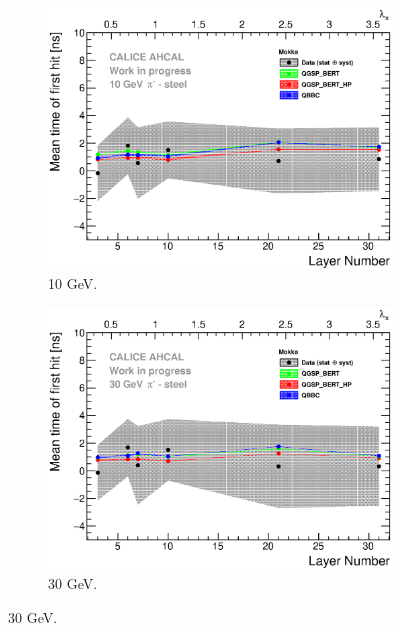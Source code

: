 \begin{figure}[htbp!]
  \begin{subfigure}[t]{0.49\textwidth}
    \centering
    \includegraphics[width=1\textwidth]{../Thesis_Plots/Timing/Pions/Plots/ComparisonToSim/Time_Depth_10GeV_Mokka.eps}
    \caption{10 GeV.}\label{fig:Depth_SimData_10GeV}
  \end{subfigure}
  \hfill
  \begin{subfigure}[t]{0.49\textwidth}
    \centering
    \includegraphics[width=1\textwidth]{../Thesis_Plots/Timing/Pions/Plots/ComparisonToSim/Time_Depth_30GeV_Mokka.eps}
    \caption{30 GeV.} \label{fig:Depth_SimData_30GeV}
  \end{subfigure}

\end{figure}
